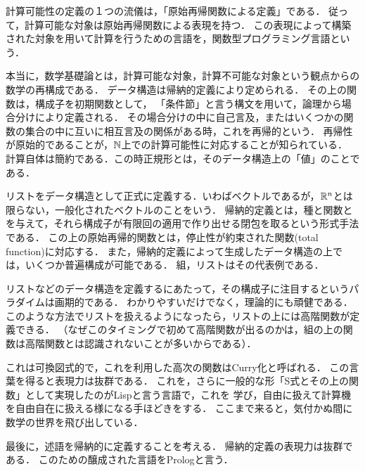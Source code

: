 \documentclass[uplatex, 12pt, dvipdfmx]{jsreport}
\begin{document}
\begin{screen}
計算可能性の定義の１つの流儀は，「原始再帰関数による定義」である．
従って，計算可能な対象は原始再帰関数による表現を持つ．
この表現によって構築された対象を用いて計算を行うための言語を，関数型プログラミング言語という．

本当に，数学基礎論とは，計算可能な対象，計算不可能な対象という観点からの数学の再構成である．
データ構造は帰納的定義により定められる．
その上の関数は，構成子を初期関数として，
「条件節」と言う構文を用いて，論理から場合分けにより定義される．
その場合分けの中に自己言及，またはいくつかの関数の集合の中に互いに相互言及の関係がある時，これを再帰的という．
再帰性が原始的であることが，$\mathbb{N}$上での計算可能性に対応することが知られている．
計算自体は簡約である．この時正規形とは，そのデータ構造上の「値」のことである．

リストをデータ構造として正式に定義する．いわばベクトルであるが，$\mathbb{R}^n$とは限らない，一般化されたベクトルのことをいう．
帰納的定義とは，種と関数とを与えて，それら構成子が有限回の適用で作り出せる閉包を取るという形式手法である．
この上の原始再帰的関数とは，停止性が約束された関数(total function)に対応する．
また，帰納的定義によって生成したデータ構造の上では，いくつか普遍構成が可能である．
組，リストはその代表例である．

リストなどのデータ構造を定義するにあたって，その構成子に注目するというパラダイムは画期的である．
わかりやすいだけでなく，理論的にも頑健である．
このような方法でリストを扱えるようになったら，リストの上には高階関数が定義できる．
（なぜこのタイミングで初めて高階関数が出るのかは，組の上の関数は高階関数とは認識されないことが多いからである）．
\begin{center}
\end{center}
これは可換図式的で，これを利用した高次の関数はCurry化と呼ばれる．
この言葉を得ると表現力は抜群である．
これを，さらに一般的な形「S式とその上の関数」として実現したのがLispと言う言語で，これを
学び，自由に扱えて計算機を自由自在に扱える様になる手ほどきをする．
ここまで来ると，気付かぬ間に数学の世界を飛び出している．

最後に，述語を帰納的に定義することを考える．
帰納的定義の表現力は抜群である．
このための醸成された言語をPrologと言う．


\end{screen}
\end{document}
